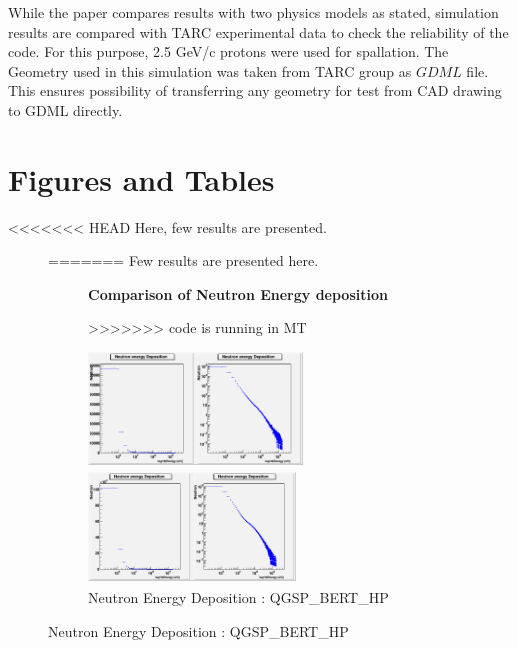 \documentclass[twocolumn,amsmath,amssymb]{snp}
\begin{document}
While the paper compares results with two physics models as stated, simulation results are compared with TARC experimental data to check the reliability of the code. For this purpose, 2.5 GeV/c protons were used for spallation. The Geometry used in this simulation was taken from TARC group as $GDML$ file. This ensures possibility of transferring any geometry for test from CAD drawing to GDML directly. 


\section*{Figures and Tables}
<<<<<<< HEAD
Here, few results are presented.

\begin{figure}
    \centering 
=======
Few results are presented here.

\begin{figure}
    \centering 
        \textbf{Comparison of Neutron Energy deposition}\par\medskip
>>>>>>>  code is running in MT
    \begin{minipage}[b]{0.4\textwidth}
    \includegraphics [height=30mm, width=55 mm] {NeutEdepBIC.png}
    \caption{\small Neutron Energy Deposition : QGSP\_BIC\_HP}
    \end{minipage}
    \begin{minipage}[b]{0.4\textwidth}
    \includegraphics [height=30mm, width=55mm] {NeutEdepBERT.png}
    \caption{\small Neutron Energy Deposition : QGSP\_BERT\_HP}
   \end{minipage}
\end{figure}



\end{figure}
\end{document}

